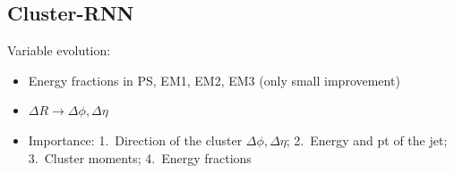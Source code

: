 
\subsection{Cluster-RNN}
\label{sec:rnn_clusters}



Variable evolution:
\begin{itemize}
\item Energy fractions in PS, EM1, EM2, EM3 (only small improvement)
\item $\Delta R \rightarrow \Delta \phi, \Delta \eta$
\item Importance: 1.\ Direction of the cluster $\Delta \phi, \Delta \eta$; 2.\
  Energy and pt of the jet; 3.\ Cluster moments; 4.\ Energy fractions
\end{itemize}

